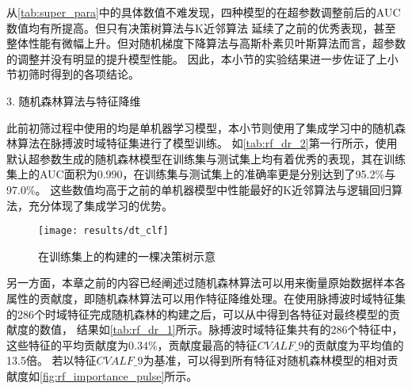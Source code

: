 从\autoref{tab:super_para}中的具体数值不难发现，四种模型的在超参数调整前后的AUC数值均有所提高。但只有决策树算法与K近邻算法
延续了之前的优秀表现，甚至整体性能有微幅上升。但对随机梯度下降算法与高斯朴素贝叶斯算法而言，超参数的调整并没有明显的提升模型性能。
因此，本小节的实验结果进一步佐证了上小节初筛时得到的各项结论。


3. 随机森林算法与特征降维

此前初筛过程中使用的均是单机器学习模型，本小节则使用了集成学习中的随机森林算法在脉搏波时域特征集进行了模型训练。
如\autoref{tab:rf_dr_2}第一行所示，使用默认超参数生成的随机森林模型在训练集与测试集上均有着优秀的表现，其在训练集上的AUC面积为0.990，在训练集与测试集上的准确率更是分别达到了95.2\%与97.0\%。
这些数值均高于之前的单机器模型中性能最好的K近邻算法与逻辑回归算法，充分体现了集成学习的优势。

\begin{figure}[htbp]
      \centering
      \texttt{[image: results/dt\_clf]}
      \caption{\label{fig:dt_clf}在训练集上的构建的一棵决策树示意}
\end{figure}

另一方面，本章之前的内容已经阐述过随机森林算法可以用来衡量原始数据样本各属性的贡献度，即随机森林算法可以用作特征降维处理。在使用脉搏波时域特征集的286个时域特征完成随机森林的构建之后，可以从中得到各特征对最终模型的贡献度的数值，
结果如\autoref{tab:rf_dr_1}所示。脉搏波时域特征集共有的286个特征中，这些特征的平均贡献度为0.34\%，贡献度最高的特征$CVALF\_9$的贡献度为平均值的13.5倍。
若以特征$CVALF\_9$为基准，可以得到所有特征对随机森林模型的相对贡献度如\autoref{fig:rf_importance_pulse}所示。

